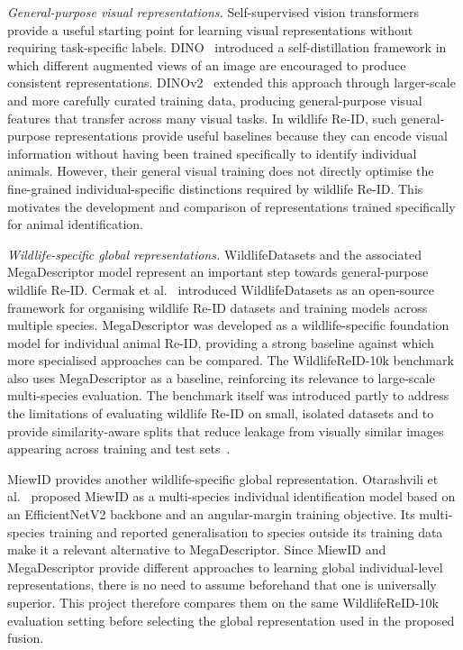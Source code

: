 \documentclass[runningheads]{llncs}
\begin{document}
\emph{General-purpose visual representations.}
Self-supervised vision transformers provide a useful starting point for
learning visual representations without requiring task-specific labels.
DINO~\cite{caron2021emerging} introduced a self-distillation framework in
which different augmented views of an image are encouraged to produce
consistent representations. DINOv2~\cite{oquab2023dinov2} extended this
approach through larger-scale and more carefully curated training data,
producing general-purpose visual features that transfer across many visual
tasks. In wildlife Re-ID, such general-purpose representations provide
useful baselines because they can encode visual information without having
been trained specifically to identify individual animals. However, their
general visual training does not directly optimise the fine-grained
individual-specific distinctions required by wildlife Re-ID. This motivates
the development and comparison of representations trained specifically for
animal identification.

\emph{Wildlife-specific global representations.}
WildlifeDatasets and the associated MegaDescriptor model represent an
important step towards general-purpose wildlife Re-ID. Cermak et
al.~\cite{cermak2024wildlifedatasets} introduced WildlifeDatasets as an
open-source framework for organising wildlife Re-ID datasets and training
models across multiple species. MegaDescriptor was developed as a
wildlife-specific foundation model for individual animal Re-ID, providing a
strong baseline against which more specialised approaches can be compared.
The WildlifeReID-10k benchmark also uses MegaDescriptor as a baseline,
reinforcing its relevance to large-scale multi-species evaluation. The
benchmark itself was introduced partly to address the limitations of
evaluating wildlife Re-ID on small, isolated datasets and to provide
similarity-aware splits that reduce leakage from visually similar images
appearing across training and test sets~\cite{adam2025wildlifereid}.

MiewID provides another wildlife-specific global representation.
Otarashvili et al.~\cite{otarashvili2024multispecies} proposed MiewID as a
multi-species individual identification model based on an EfficientNetV2
backbone and an angular-margin training objective. Its multi-species
training and reported generalisation to species outside its training data
make it a relevant alternative to MegaDescriptor. Since MiewID and
MegaDescriptor provide different approaches to learning global
individual-level representations, there is no need to assume beforehand
that one is universally superior. This project therefore compares them on
the same WildlifeReID-10k evaluation setting before selecting the global
representation used in the proposed fusion.
\end{document}
